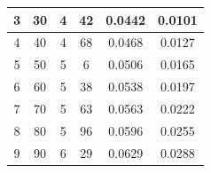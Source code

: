 \documentclass{article}
\begin{document}
\begin{table}[h!]
\begin{tabular}{cccccc}
3      & 30                                                           & 4                                                                              & 42                                                                           & 0.0442                                            & 0.0101                                              \\ \hline
4      & 40                                                           & 4                                                                              & 68                                                                           & 0.0468                                            & 0.0127                                              \\ \hline
5      & 50                                                           & 5                                                                              & 6                                                                            & 0.0506                                            & 0.0165                                              \\ \hline
6      & 60                                                           & 5                                                                              & 38                                                                           & 0.0538                                            & 0.0197                                              \\ \hline
7      & 70                                                           & 5                                                                              & 63                                                                           & 0.0563                                            & 0.0222                                              \\ \hline
8      & 80                                                           & 5                                                                              & 96                                                                           & 0.0596                                            & 0.0255                                              \\ \hline
9      & 90                                                           & 6                                                                              & 29                                                                           & 0.0629                                            & 0.0288                                              \\ \hline

\end{tabular}
\end{table}
\end{document}
